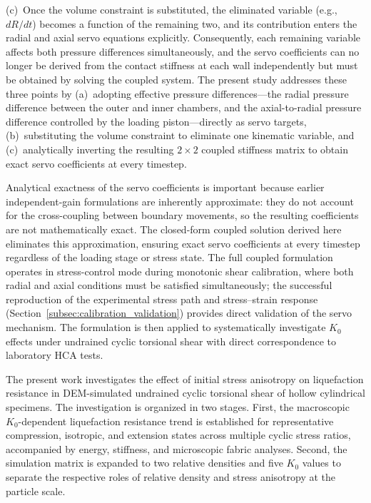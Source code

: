 \documentclass[a4paper,fleqn]{cas-sc}
\newcommand{\Kzero}{\ensuremath{K_0}}
\begin{document}
(c)~Once the volume constraint is substituted, the eliminated variable (e.g., $dR/dt$) becomes a function of the remaining two, and its contribution enters the radial and axial servo equations explicitly. Consequently, each remaining variable affects both pressure differences simultaneously, and the servo coefficients can no longer be derived from the contact stiffness at each wall independently but must be obtained by solving the coupled system.
The present study addresses these three points by (a)~adopting effective pressure differences---the radial pressure difference between the outer and inner chambers, and the axial-to-radial pressure difference controlled by the loading piston---directly as servo targets, (b)~substituting the volume constraint to eliminate one kinematic variable, and (c)~analytically inverting the resulting $2\times 2$ coupled stiffness matrix to obtain exact servo coefficients at every timestep.

Analytical exactness of the servo coefficients is important because earlier independent-gain formulations are inherently approximate: they do not account for the cross-coupling between boundary movements, so the resulting coefficients are not mathematically exact. The closed-form coupled solution derived here eliminates this approximation, ensuring exact servo coefficients at every timestep regardless of the loading stage or stress state. The full coupled formulation operates in stress-control mode during monotonic shear calibration, where both radial and axial conditions must be satisfied simultaneously; the successful reproduction of the experimental stress path and stress--strain response (Section~\ref{subsec:calibration_validation}) provides direct validation of the servo mechanism. The formulation is then applied to systematically investigate \Kzero{} effects under undrained cyclic torsional shear with direct correspondence to laboratory HCA tests.

The present work investigates the effect of initial stress anisotropy on liquefaction resistance in DEM-simulated undrained cyclic torsional shear of hollow cylindrical specimens. The investigation is organized in two stages. First, the macroscopic \Kzero{}-dependent liquefaction resistance trend is established for representative compression, isotropic, and extension states across multiple cyclic stress ratios, accompanied by energy, stiffness, and microscopic fabric analyses. Second, the simulation matrix is expanded to two relative densities and five \Kzero{} values to separate the respective roles of relative density and stress anisotropy at the particle scale.
\end{document}
